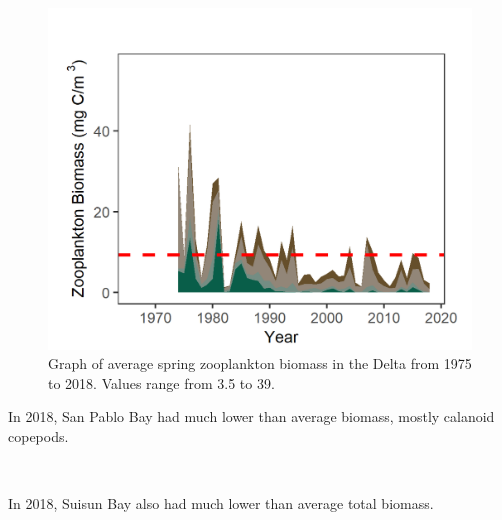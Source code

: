 \documentclass[
]{book}
\begin{document}
\begin{panel-grid}
\begin{columns-nocenter}
\begin{column800}
\begin{expand}
\begin{figure}
\includegraphics[width=15.25in]{figures/zoops_dtspring} \caption{Graph of average spring zooplankton biomass in the Delta from 1975 to 2018. Values range from 3.5 to 39.}\label{fig:unnamed-chunk-29}
\end{figure}

\end{expand}

\end{column800}

\end{columns-nocenter}

\begin{columns-nocenter}

\begin{column800}

In 2018, San Pablo Bay had much lower than average biomass, mostly calanoid copepods.

\end{column800}

\begin{column40}

~

\end{column40}

\begin{column800}

In 2018, Suisun Bay also had much lower than average total biomass.

\end{column800}


\end{columns-nocenter}
\end{panel-grid}
\end{document}
